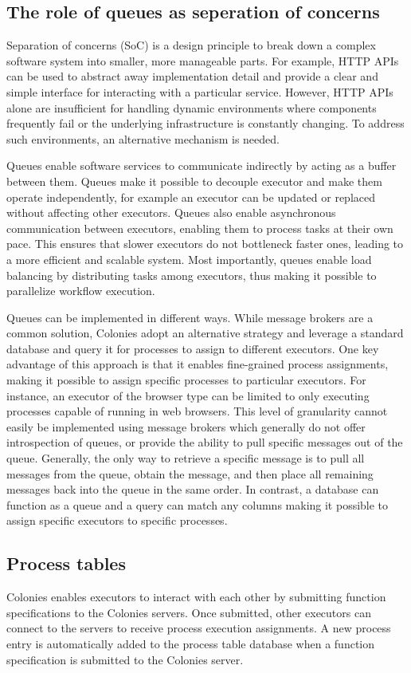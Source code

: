\documentclass{article}
\begin{document}
\subsection{The role of queues as seperation of concerns}
Separation of concerns (SoC) is a design principle to break down a complex software system into smaller, more manageable parts. For example, HTTP APIs can be used to abstract away implementation detail and provide a clear and simple interface for interacting with a particular service. However, HTTP APIs alone are insufficient for handling dynamic environments where components frequently fail or the underlying infrastructure is constantly changing. To address such environments, an alternative mechanism is needed. 

Queues enable software services to communicate indirectly by acting as a buffer between them. Queues make it possible to decouple executor and make them operate independently, for example an executor can be updated or replaced without affecting other executors. Queues also enable asynchronous communication between executors, enabling them to process tasks at their own pace. This ensures that slower executors do not bottleneck faster ones, leading to a more efficient and scalable system. Most importantly, queues enable load balancing by distributing tasks among executors, thus making it possible to parallelize workflow execution. 

Queues can be implemented in different ways. While message brokers are a common solution, Colonies adopt an alternative strategy and leverage a standard database and query it for processes to assign to different executors. One key advantage of this approach is that it enables fine-grained process assignments, making it possible to assign specific processes to particular executors. For instance, an executor of the browser type can be limited to only executing processes capable of running in web browsers. This level of granularity cannot easily be implemented using message brokers which generally do not offer introspection of queues, or provide the ability to pull specific messages out of the queue. Generally, the only way to retrieve a specific message is to pull all messages from the queue, obtain the message, and then place all remaining messages back into the queue in the same order. In contrast, a database can function as a queue and a query can match any columns making it possible to assign specific executors to specific processes.

\subsection{Process tables}
Colonies enables executors to interact with each other by submitting function specifications to the Colonies servers. Once submitted, other executors can connect to the servers to receive process execution assignments. A new process entry is automatically added to the process table database when a function specification is submitted to the Colonies server.
\end{document}
